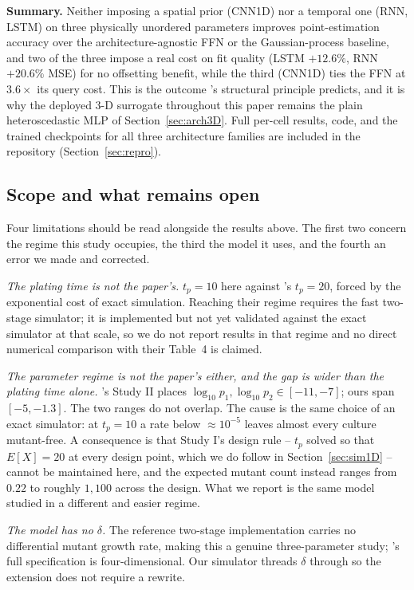 \documentclass[sn-basic,iicol,pdflatex]{sn-jnl}
\begin{document}
\textbf{Summary.} Neither imposing a spatial prior (CNN1D) nor a temporal one
(RNN, LSTM) on three physically unordered parameters improves point-estimation
accuracy over the architecture-agnostic FFN or the Gaussian-process baseline,
and two of the three impose a real cost on fit quality (LSTM $+12.6\%$, RNN
$+20.6\%$ MSE) for no offsetting benefit, while the third (CNN1D) ties the FFN
at $3.6\times$ its query cost. This is the outcome
\citet{radev2020}'s structural principle predicts, and it is why the deployed
3-D surrogate throughout this paper remains the plain heteroscedastic MLP of
Section~\ref{sec:arch3D}. Full per-cell results, code, and the trained
checkpoints for all three architecture families are included in the
repository (Section~\ref{sec:repro}).

\subsection{Scope and what remains open}
\label{sec:sim3D_coverage}

Four limitations should be read alongside the results above. The first two
concern the regime this study occupies, the third the model it uses, and the
fourth an error we made and corrected.

\emph{The plating time is not the paper's.} $t_p = 10$ here against
\citeauthor{lu2023}'s $t_p = 20$, forced by the exponential cost of exact
simulation. Reaching their regime requires the fast two-stage simulator; it is
implemented but not yet validated against the exact simulator at that scale, so
we do not report results in that regime and no direct numerical comparison with
their Table~4 is claimed.

\emph{The parameter regime is not the paper's either, and the gap is wider than
the plating time alone.} \citeauthor{lu2023}'s Study II places
$\log_{10}p_1, \log_{10}p_2 \in [-11,-7]$; ours span $[-5,-1.3]$. The two ranges
do not overlap. The cause is the same choice of an exact simulator: at
$t_p = 10$ a rate below $\approx 10^{-5}$ leaves almost every culture
mutant-free. A consequence is that Study I's design rule -- $t_p$ solved so that
$E[X] = 20$ at every design point, which we do follow in Section~\ref{sec:sim1D}
-- cannot be maintained here, and the expected mutant count instead ranges from
$0.22$ to roughly $1{,}100$ across the design. What we report is the same model
studied in a different and easier regime.

\emph{The model has no $\delta$.} The reference two-stage implementation carries
no differential mutant growth rate, making this a genuine three-parameter study;
\citeauthor{lu2023}'s full specification is four-dimensional. Our simulator
threads $\delta$ through so the extension does not require a rewrite.
\end{document}
